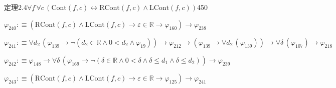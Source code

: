 \begin{fullproof}{定理2.4}{$\forall f\,\forall c\,(\mathrm{Cont}(f,c) \leftrightarrow \mathrm{RCont}(f,c) \land \mathrm{LCont}(f,c))$}{450}
\begin{abbrevlist}
\item $\varphi_{240} :\equiv (\mathrm{RCont}(f,c) \land \mathrm{LCont}(f,c) \to \varepsilon \in \mathbb{R} \to \varphi_{160}) \to \varphi_{238}$
\item $\varphi_{241} :\equiv \forall d_{2}\,(\varphi_{139} \to \neg (d_{2} \in \mathbb{R} \land 0 < d_{2} \land \varphi_{19})) \to \varphi_{212} \to (\varphi_{139} \to \forall d_{2}\,(\varphi_{139})) \to \forall \delta\,(\varphi_{107}) \to \varphi_{218}$
\item $\varphi_{242} :\equiv \varphi_{148} \to \forall \delta\,(\varphi_{169} \to \neg (\delta \in \mathbb{R} \land 0 < \delta \land \delta \leq d_{1} \land \delta \leq d_{2})) \to \varphi_{239}$
\item $\varphi_{243} :\equiv (\mathrm{RCont}(f,c) \land \mathrm{LCont}(f,c) \to \varepsilon \in \mathbb{R} \to \varphi_{125}) \to \varphi_{241}$
\end{abbrevlist}
\end{fullproof}
